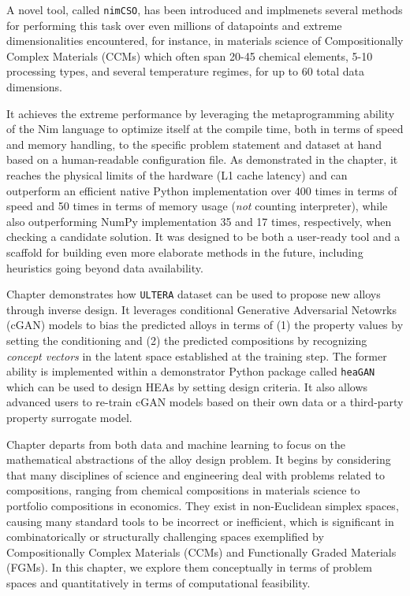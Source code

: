 A novel tool, called \texttt{nimCSO}, has been introduced and implmenets several methods for performing this task over even millions of datapoints and extreme dimensionalities encountered, for instance, in materials science of Compositionally Complex Materials (CCMs) which often span 20-45 chemical elements, 5-10 processing types, and several temperature regimes, for up to 60 total data dimensions.

It achieves the extreme performance by leveraging the metaprogramming ability of the Nim language to optimize itself at the compile time, both in terms of speed and memory handling, to the specific problem statement and dataset at hand based on a human-readable configuration file. As demonstrated in the chapter, it reaches the physical limits of the hardware (L1 cache latency) and can outperform an efficient native Python implementation over 400 times in terms of speed and 50 times in terms of memory usage (\emph{not} counting interpreter), while also outperforming NumPy implementation 35 and 17 times, respectively, when checking a candidate solution. It was designed to be both a user-ready tool and a scaffold for building even more elaborate methods in the future, including heuristics going beyond data availability. 


Chapter  demonstrates how \texttt{ULTERA} dataset can be used to propose new alloys through inverse design. It leverages conditional Generative Adversarial Netowrks (cGAN) models to bias the predicted alloys in terms of (1) the property values by setting the conditioning and (2) the predicted compositions by recognizing \emph{concept vectors} in the latent space established at the training step. The former ability is implemented within a demonstrator Python package called \texttt{heaGAN} which can be used to design HEAs by setting design criteria. It also allows advanced users to re-train cGAN models based on their own data or a third-party property surrogate model.

Chapter  departs from both data and machine learning to focus on the mathematical abstractions of the alloy design problem. It begins by considering that many disciplines of science and engineering deal with problems related to compositions, ranging from chemical compositions in materials science to portfolio compositions in economics. They exist in non-Euclidean simplex spaces, causing many standard tools to be incorrect or inefficient, which is significant in combinatorically or structurally challenging spaces exemplified by Compositionally Complex Materials (CCMs) and Functionally Graded Materials (FGMs). In this chapter, we explore them conceptually in terms of problem spaces and quantitatively in terms of computational feasibility.

